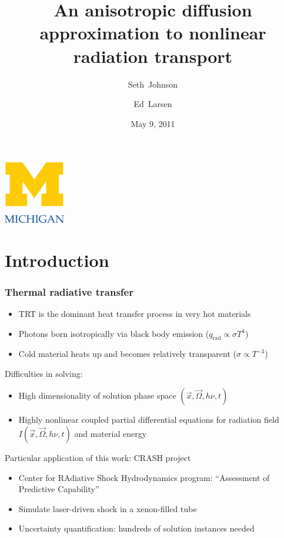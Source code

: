 \documentclass{beamer}
\title[MC 2011]%
{An anisotropic diffusion approximation to nonlinear radiation transport}
\author[SRJ, EWL]{Seth~Johnson \and Ed~Larsen}
\institute[UMich]{
University of Michigan, Ann Arbor
}
\date[5/9/2011]{May 9, 2011}
\begin{document}

\begin{frame}
\titlepage
\begin{center}
  \includegraphics[width=0.2\textwidth]{../figures/umlogo}
\end{center}
\end{frame}

\section{Introduction}
\begin{frame}
  \frametitle{Thermal radiative transfer}
  \begin{itemize}
    \item TRT is the dominant heat transfer process in very hot materials
    \item Photons born isotropically via black body emission
      ($q_\text{rad} \propto \sigma T^4$)
    \item Cold material heats up and becomes relatively transparent
      ($\sigma\propto T^{-3}$)
  \end{itemize}

  Difficulties in solving:
  \begin{itemize}
    \item High dimensionality of solution phase space $(\vec{x}, \vec{\Omega},
      h\nu, t)$
    \item Highly nonlinear coupled partial differential equations for radiation
      field $I(\vec{x}, \vec{\Omega}, h\nu, t)$ and material energy
  \end{itemize}

  Particular application of this work: CRASH project
  \begin{itemize}
    \item Center for RAdiative Shock Hydrodynamics program: ``Assessment
      of Predictive Capability''
    \item Simulate laser-driven shock in a xenon-filled tube
    \item Uncertainty quantification: hundreds of solution instances needed
  \end{itemize}
\end{frame}
\end{document}
